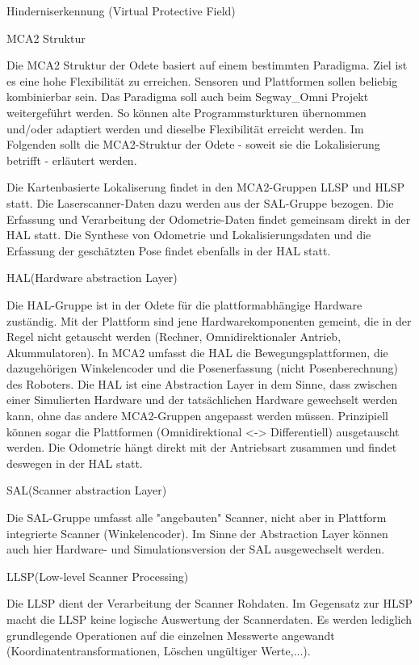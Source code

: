Hinderniserkennung (Virtual Protective Field)

MCA2 Struktur

Die MCA2 Struktur der Odete basiert auf einem bestimmten Paradigma. Ziel ist es eine hohe Flexibilität zu erreichen.
 Sensoren und Plattformen sollen beliebig kombinierbar sein. Das Paradigma soll
 auch beim Segway\_Omni Projekt weitergeführt werden. So können alte Programmsturkturen übernommen und/oder adaptiert werden und dieselbe Flexibilität
 erreicht werden. Im Folgenden sollt die MCA2-Struktur der Odete - soweit sie
 die Lokalisierung betrifft - erläutert werden.
 
Die Kartenbasierte Lokaliserung findet in den MCA2-Gruppen LLSP und HLSP statt.
 Die Laserscanner-Daten dazu werden aus der SAL-Gruppe bezogen. Die Erfassung und Verarbeitung der Odometrie-Daten findet
 gemeinsam direkt in der HAL statt. Die Synthese von Odometrie und Lokalisierungsdaten und die Erfassung der geschätzten
 Pose findet ebenfalls in der HAL statt. 
 
HAL(Hardware abstraction Layer)

Die HAL-Gruppe ist in der Odete für die plattformabhängige Hardware zuständig. Mit der Plattform sind jene
 Hardwarekomponenten gemeint, die in der Regel nicht getauscht werden (Rechner, Omnidirektionaler Antrieb, Akummulatoren).
 In MCA2 umfasst die HAL die Bewegungsplattformen, die dazugehörigen Winkelencoder und die Posenerfassung
 (nicht Posenberechnung) des Roboters. Die HAL ist eine Abstraction Layer in dem Sinne, dass zwischen einer Simulierten
 Hardware und der tatsächlichen Hardware gewechselt werden kann, ohne das andere MCA2-Gruppen angepasst werden müssen.
 Prinzipiell können sogar die Plattformen (Omnidirektional <-> Differentiell) ausgetauscht werden. Die Odometrie hängt
 direkt mit der Antriebsart zusammen und findet deswegen in der HAL statt.

 SAL(Scanner abstraction Layer)

Die SAL-Gruppe umfasst alle "angebauten" Scanner, nicht aber in Plattform integrierte Scanner (Winkelencoder).
 Im Sinne der Abstraction Layer können auch hier Hardware- und Simulationsversion der SAL ausgewechselt werden.
 
LLSP(Low-level Scanner Processing)

Die LLSP dient der Verarbeitung der Scanner Rohdaten. Im Gegensatz zur HLSP macht die LLSP keine logische Auswertung
 der Scannerdaten. Es werden lediglich grundlegende Operationen auf die einzelnen Messwerte angewandt
 (Koordinatentransformationen, Löschen ungültiger Werte,...).

